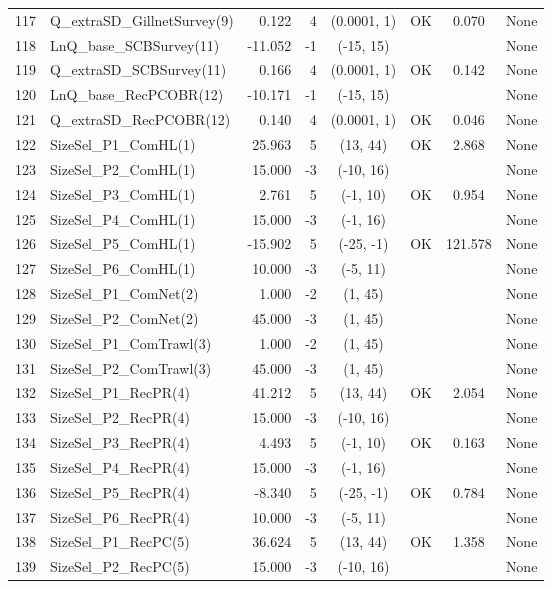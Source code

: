 \documentclass[12pt,]{article}
\begin{document}
\begin{landscape}
\begin{longtable}{rlrrcccl}
  117 & Q\_extraSD\_GillnetSurvey(9) & 0.122 & 4 & (0.0001, 1) & OK & 0.070 & None \\ 
  118 & LnQ\_base\_SCBSurvey(11) & -11.052 & -1 & (-15, 15) &  &  & None \\ 
  119 & Q\_extraSD\_SCBSurvey(11) & 0.166 & 4 & (0.0001, 1) & OK & 0.142 & None \\ 
  120 & LnQ\_base\_RecPCOBR(12) & -10.171 & -1 & (-15, 15) &  &  & None \\ 
  121 & Q\_extraSD\_RecPCOBR(12) & 0.140 & 4 & (0.0001, 1) & OK & 0.046 & None \\ 
  122 & SizeSel\_P1\_ComHL(1) & 25.963 & 5 & (13, 44) & OK & 2.868 & None \\ 
  123 & SizeSel\_P2\_ComHL(1) & 15.000 & -3 & (-10, 16) &  &  & None \\ 
  124 & SizeSel\_P3\_ComHL(1) & 2.761 & 5 & (-1, 10) & OK & 0.954 & None \\ 
  125 & SizeSel\_P4\_ComHL(1) & 15.000 & -3 & (-1, 16) &  &  & None \\ 
  126 & SizeSel\_P5\_ComHL(1) & -15.902 & 5 & (-25, -1) & OK & 121.578 & None \\ 
  127 & SizeSel\_P6\_ComHL(1) & 10.000 & -3 & (-5, 11) &  &  & None \\ 
  128 & SizeSel\_P1\_ComNet(2) & 1.000 & -2 & (1, 45) &  &  & None \\ 
  129 & SizeSel\_P2\_ComNet(2) & 45.000 & -3 & (1, 45) &  &  & None \\ 
  130 & SizeSel\_P1\_ComTrawl(3) & 1.000 & -2 & (1, 45) &  &  & None \\ 
  131 & SizeSel\_P2\_ComTrawl(3) & 45.000 & -3 & (1, 45) &  &  & None \\ 
  132 & SizeSel\_P1\_RecPR(4) & 41.212 & 5 & (13, 44) & OK & 2.054 & None \\ 
  133 & SizeSel\_P2\_RecPR(4) & 15.000 & -3 & (-10, 16) &  &  & None \\ 
  134 & SizeSel\_P3\_RecPR(4) & 4.493 & 5 & (-1, 10) & OK & 0.163 & None \\ 
  135 & SizeSel\_P4\_RecPR(4) & 15.000 & -3 & (-1, 16) &  &  & None \\ 
  136 & SizeSel\_P5\_RecPR(4) & -8.340 & 5 & (-25, -1) & OK & 0.784 & None \\ 
  137 & SizeSel\_P6\_RecPR(4) & 10.000 & -3 & (-5, 11) &  &  & None \\ 
  138 & SizeSel\_P1\_RecPC(5) & 36.624 & 5 & (13, 44) & OK & 1.358 & None \\ 
  139 & SizeSel\_P2\_RecPC(5) & 15.000 & -3 & (-10, 16) &  &  & None \\ 

\end{longtable}
\end{landscape}
\end{document}
